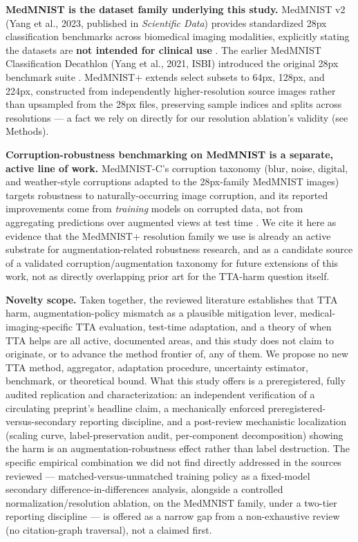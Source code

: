\textbf{MedMNIST is the dataset family underlying this study.} MedMNIST v2 (Yang et al., 2023, published in \emph{Scientific Data}) provides standardized 28px classification benchmarks across biomedical imaging modalities, explicitly stating the datasets are \textbf{not intended for clinical use} \citep{yang2023medmnistv2}. The earlier MedMNIST Classification Decathlon (Yang et al., 2021, ISBI) introduced the original 28px benchmark suite \citep{yang2021medmnist}. MedMNIST+ extends select subsets to 64px, 128px, and 224px, constructed from independently higher-resolution source images rather than upsampled from the 28px files, preserving sample indices and splits across resolutions --- a fact we rely on directly for our resolution ablation's validity (see Methods).

\textbf{Corruption-robustness benchmarking on MedMNIST is a separate, active line of work.} MedMNIST-C's corruption taxonomy (blur, noise, digital, and weather-style corruptions adapted to the 28px-family MedMNIST images) targets robustness to naturally-occurring image corruption, and its reported improvements come from \emph{training} models on corrupted data, not from aggregating predictions over augmented views at test time \citep{disalvo2024medmnistc}. We cite it here as evidence that the MedMNIST+ resolution family we use is already an active substrate for augmentation-related robustness research, and as a candidate source of a validated corruption/augmentation taxonomy for future extensions of this work, not as directly overlapping prior art for the TTA-harm question itself.

\textbf{Novelty scope.} Taken together, the reviewed literature establishes that TTA harm, augmentation-policy mismatch as a plausible mitigation lever, medical-imaging-specific TTA evaluation, test-time adaptation, and a theory of when TTA helps are all active, documented areas, and this study does not claim to originate, or to advance the method frontier of, any of them. We propose no new TTA method, aggregator, adaptation procedure, uncertainty estimator, benchmark, or theoretical bound. What this study offers is a preregistered, fully audited replication and characterization: an independent verification of a circulating preprint's headline claim, a mechanically enforced preregistered-versus-secondary reporting discipline, and a post-review mechanistic localization (scaling curve, label-preservation audit, per-component decomposition) showing the harm is an augmentation-robustness effect rather than label destruction. The specific empirical combination we did not find directly addressed in the sources reviewed --- matched-versus-unmatched training policy as a fixed-model secondary difference-in-differences analysis, alongside a controlled normalization/resolution ablation, on the MedMNIST family, under a two-tier reporting discipline --- is offered as a narrow gap from a non-exhaustive review (no citation-graph traversal), not a claimed first.

